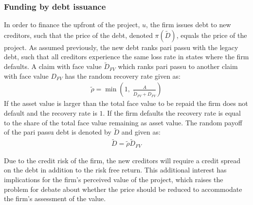 \documentclass[main.tex]{subfiles}
\begin{document}
    \subsubsection{Funding by debt issuance}\label{sec:example-risk-free-project-debt-issuance}
        In order to finance the upfront of the project, $u$, the firm issues debt to new creditors, 
        such that the price of the debt, denoted $\pi(\tilde{D})$, equals the price of the project.
        As assumed previously, the new debt ranks pari passu with the legacy debt, 
        such that all creditors experience the same loss rate in states where the firm defaults.
        A claim with face value $\tilde{D}_{FV}$ which ranks pari passu to another claim 
        with face value $D_{FV}$ has the random recovery rate given as:
            \begin{align}
                \tilde{\rho} = \min\left(
                    1,\;
                    \frac{A}{\tilde{D}_{FV} + D_{FV}}
                \right)
            \end{align}
        If the asset value is larger than the total face value to be repaid
        the firm does not default and the recovery rate is $1$.
        If the firm defaults the recovery rate is equal to the share of the total face value remaining as asset value.
        The random payoff of the pari passu debt is denoted by $\tilde{D}$ and given as:
            \begin{align}
                \tilde{D}
                    = \tilde{\rho}\tilde{D}_{FV}
            \end{align}

        Due to the credit risk of the firm, the new creditors will require a credit spread on the debt 
        in addition to the risk free return.
        This additional interest has implications for the firm's perceived value of the project, 
        which raises the problem for debate about whether the price should be reduced 
        to accommodate the firm's assessment of the value.
\end{document}

